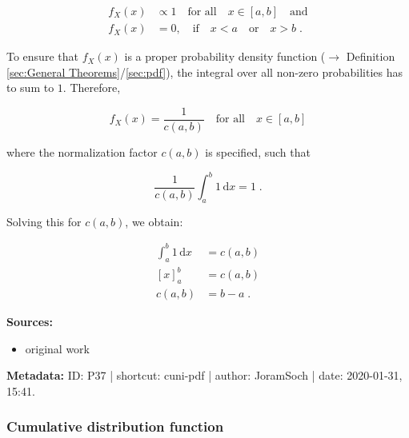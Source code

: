 \documentclass[a4paper,12pt,twoside]{book}
\begin{document}
\begin{equation} \label{eq:cuni-pdf-cuni-pdf-s1}
\begin{split}
f_X(x) &\propto 1 \quad \text{for all} \quad x \in [a,b] \quad \text{and} \\
f_X(x) &= 0, \quad\!\! \text{if} \quad x < a \quad \text{or} \quad x > b \; .
\end{split}
\end{equation}

To ensure that $f_X(x)$ is a proper probability density function ($\rightarrow$ Definition \ref{sec:General Theorems}/\ref{sec:pdf}), the integral over all non-zero probabilities has to sum to $1$. Therefore,

\begin{equation} \label{eq:cuni-pdf-cuni-pdf-s2}
f_X(x) = \frac{1}{c(a,b)} \quad \text{for all} \quad x \in [a,b]
\end{equation}

where the normalization factor $c(a,b)$ is specified, such that

\begin{equation} \label{eq:cuni-pdf-cuni-pdf-s3}
\frac{1}{c(a,b)} \int_{a}^{b} 1 \, \mathrm{d}x = 1 \; .
\end{equation}

Solving this for $c(a,b)$, we obtain:

\begin{equation} \label{eq:cuni-pdf-cuni-pdf-s4}
\begin{split}
\int_{a}^{b} 1 \, \mathrm{d}x &= c(a,b) \\
[x]_a^b &= c(a,b) \\
c(a,b) &= b-a \; .
\end{split}
\end{equation}


\vspace{1em}
\textbf{Sources:}
\begin{itemize}
\item original work\end{itemize}


\vspace{1em}
\textbf{Metadata:} ID: P37 | shortcut: cuni-pdf | author: JoramSoch | date: 2020-01-31, 15:41.
\vspace{1em}



\subsubsection[\textbf{Cumulative distribution function}]{Cumulative distribution function} \label{sec:cuni-cdf}
\setcounter{equation}{0}
\end{document}
